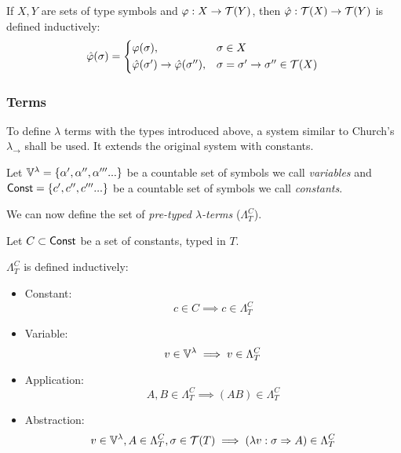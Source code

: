 \documentclass[main.tex]{subfiles}
\begin{document}
\begin{defn}
    If $X, Y$ are sets of type symbols and $\varphi: X \rightarrow \mathcal{T}( Y )$,
    then $\hat{\varphi} : \mathcal{T}( X ) \rightarrow \mathcal{T}( Y )$ is defined inductively:
    \begin{equation*}
        \hat{\varphi}(\sigma) =
        \begin{cases*}
            \varphi(\sigma) ,& $\sigma \in X$ \\
            \hat{\varphi}(\sigma') \rightarrow \hat{\varphi}(\sigma'') ,&
                $\sigma = \sigma' \rightarrow \sigma'' \in \tclos{X}$ \\
        \end{cases*}
    \end{equation*}
\end{defn}

\subsubsection{Terms}
To define $\lambda$ terms with the types introduced above, a system similar
to Church's $\lambda_\rightarrow$ \cite[chap.~2.4]{ttfp} shall be used. It
extends the original system with constants.

Let $\mathbb{V}^{\lambda} = \{ \alpha', \alpha'', \alpha''' ... \}$ be a countable set of symbols
we call \emph{variables} and $\mathsf{Const} = \{ c', c'', c''' ... \}$ be a countable
set of symbols we call \emph{constants}.

We can now define the set of
\emph{pre-typed $\lambda$-terms} ($\Lambda_T^C$).

\begin{defn}
    \label{def:lambdaterm}
    Let $C \subset \mathsf{Const}$ be a set of constants, typed in $T$.

    $\Lambda_T^C$ is defined inductively:
    \begin{itemize}
        \item Constant:    \[ c \in C \implies c \in \Lambda_T^C \]
        \item Variable:    \[ v \in \mathbb{V}^{\lambda} \implies v \in \Lambda_T^C \]
        \item Application: \[ A, B \in \Lambda_T^C \implies (AB) \in \Lambda_T^C \]
        \item Abstraction: \[ v \in \mathbb{V}^{\lambda}, A \in \Lambda_T^C, \sigma \in \mathcal{T}( T )
                \implies (\lambda v : \sigma \Rightarrow A) \in \Lambda_T^C \]
    \end{itemize}
\end{defn}
\end{document}
